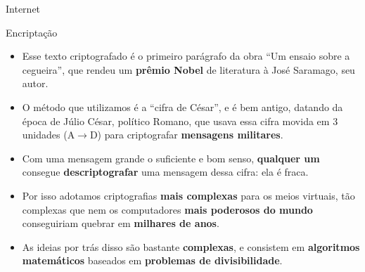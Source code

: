 \begin{frame}{Internet}
	\begin{block}{Encriptação}
		\begin{itemize}
			\item Esse texto criptografado é o primeiro parágrafo da obra ``Um ensaio sobre a cegueira'', que rendeu um \textbf{prêmio Nobel} de literatura à José Saramago, seu autor.
			\item O método que utilizamos é a ``cifra de César'', e é bem antigo, datando da época de Júlio César, político Romano, que usava essa cifra movida em 3 unidades (A$ \to $D) para criptografar \textbf{mensagens militares}.
			\item Com uma mensagem grande o suficiente e bom senso, \textbf{qualquer um} consegue \textbf{descriptografar} uma mensagem dessa cifra: ela é fraca.
			\item Por isso adotamos criptografias \textbf{mais complexas} para os meios virtuais, tão complexas que nem os computadores \textbf{mais poderosos do mundo} conseguiriam quebrar em \textbf{milhares de anos}.
			\item As ideias por trás disso são bastante \textbf{complexas}, e consistem em \textbf{algoritmos matemáticos} baseados em \textbf{problemas de divisibilidade}.
		\end{itemize}
	\end{block}
\end{frame}




